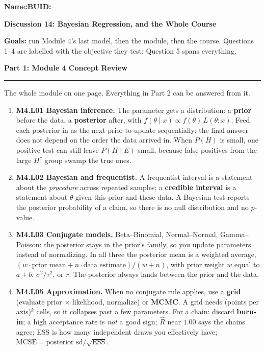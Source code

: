 \documentclass[11pt]{article}
\newcommand{\blankline}[1]{\underline{\hspace{#1}}}
\newcommand{\parttitle}[1]{%
  \par\medskip\noindent
  {\large\bfseries #1}\par
  \vspace{-.5em}\noindent\rule{\linewidth}{0.4pt}\par\smallskip}
\begin{document}
\noindent\textbf{Name:}\blankline{2.3in}\hfill\textbf{BUID:}\blankline{1.6in}

\begin{center}
  {\Large\bfseries Discussion 14: Bayesian Regression, and the Whole Course}
\end{center}

\noindent\textbf{Goals:} run Module 4's last model, then the module, then the course. Questions 1--4
are labelled with the objective they test; Question 5 spans everything.

\parttitle{Part 1: Module 4 Concept Review}

{\small

\noindent The whole module on one page. Everything in Part 2 can be answered from it.

\begin{enumerate}[label=\textbf{\arabic*.}, wide=0pt, itemsep=.4em, topsep=.5em]

\item \textbf{M4.L01 Bayesian inference.} The parameter gets a distribution: a \textbf{prior} before
the data, a \textbf{posterior} after, with
$f(\theta \mid x) \propto f(\theta)\,L(\theta;x)$. Feed each posterior in as the next prior to update
sequentially; the final answer does not depend on the order the data arrived in. When $P(H)$ is
small, one positive test can still leave $P(H \mid E)$ small, because false positives from the large
$H^c$ group swamp the true ones.

\item \textbf{M4.L02 Bayesian and frequentist.} A frequentist interval is a statement about the
\emph{procedure} across repeated samples; a \textbf{credible interval} is a statement about
$\theta$ given this prior and these data. A Bayesian test reports the posterior probability of a
claim, so there is no null distribution and no $p$-value.

\item \textbf{M4.L03 Conjugate models.} Beta--Binomial, Normal--Normal, Gamma--Poisson: the posterior
stays in the prior's family, so you update parameters instead of normalizing. In all three the
posterior mean is a weighted average,
$(w\cdot\text{prior mean} + n\cdot\text{data estimate})/(w+n)$, with prior weight $w$ equal to
$a+b$, $\sigma^2/\tau^2$, or $r$. The posterior always lands between the prior and the data.

\item \textbf{M4.L05 Approximation.} When no conjugate rule applies, use a \textbf{grid} (evaluate
prior $\times$ likelihood, normalize) or \textbf{MCMC}. A grid needs (points per axis)$^{k}$ cells, so
it collapses past a few parameters. For a chain: discard \textbf{burn-in}; a high acceptance rate is
\emph{not} a good sign; $\widehat{R}$ near $1.00$ says the chains agree; ESS is how many independent
draws you effectively have; $\text{MCSE} = \text{posterior sd}/\sqrt{\text{ESS}}$.


\end{enumerate}}
\end{document}
